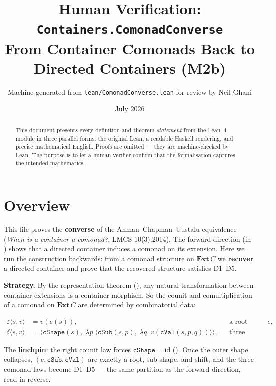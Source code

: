 \documentclass[11pt,a4paper]{article}
\title{Human Verification: \texttt{Containers.ComonadConverse}\\[4pt]
  \large From Container Comonads Back to Directed Containers (M2b)}
\author{Machine-generated from \texttt{lean/ComonadConverse.lean} for review by Neil Ghani}
\date{July 2026}
\begin{document}
\maketitle

\begin{abstract}
This document presents every definition and theorem \emph{statement} from the
Lean~4 module  in three parallel forms: the
original Lean, a readable Haskell rendering, and precise mathematical English.
Proofs are omitted --- they are machine-checked by Lean.  The purpose is to let
a human verifier confirm that the formalisation captures the intended
mathematics.
\end{abstract}

\tableofcontents
\bigskip

\section{Overview}

This file proves the \textbf{converse} of the Ahman--Chapman--Uustalu
equivalence (\emph{When is a container a comonad?}, LMCS 10(3):2014).  The
forward direction (in ) shows that a directed
container induces a comonad on its extension.  Here we run the construction
backwards: from a comonad structure on $\mathbf{Ext}\,C$ we \textbf{recover} a
directed container and prove that the recovered structure satisfies D1--D5.

\medskip
\noindent\textbf{Strategy.}  By the representation theorem
(), any natural transformation between container
extensions is a container morphism.  So the counit and comultiplication of a
comonad on $\mathbf{Ext}\,C$ are determined by combinatorial data:

\begin{align*}
  \varepsilon\langle s, v \rangle &= v(e(s)), & &\text{a root choice }e,\\
  \delta\langle s, v \rangle &=
    \bigl\langle \mathtt{cShape}(s),\;
      \lambda p.\langle \mathtt{cSub}(s,p),\; \lambda q.\; v(\mathtt{cVal}(s,p,q)) \rangle
    \bigr\rangle,
    & &\text{three components.}
\end{align*}

The \textbf{linchpin}: the right counit law forces $\mathtt{cShape} = \mathrm{id}$
().  Once the outer shape collapses, $(e, \mathtt{cSub}, \mathtt{cVal})$
are exactly a root, sub-shape, and shift, and the three comonad laws become D1--D5 ---
the same partition as the forward direction, read in reverse.
\end{document}
